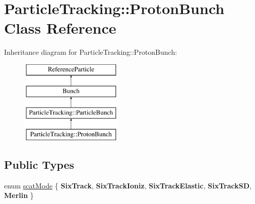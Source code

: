 \hypertarget{classParticleTracking_1_1ProtonBunch}{}\section{Particle\+Tracking\+:\+:Proton\+Bunch Class Reference}
\label{classParticleTracking_1_1ProtonBunch}
Inheritance diagram for Particle\+Tracking\+:\+:Proton\+Bunch\+:\begin{figure}[H]
\begin{center}
\leavevmode
\includegraphics[height=4.000000cm]{classParticleTracking_1_1ProtonBunch}
\end{center}
\end{figure}
\subsection*{Public Types}
\begin{DoxyCompactItemize}
\item 
enum \hyperlink{classParticleTracking_1_1ProtonBunch_acf0cdd892624c9fd814e6510e2aecf33}{scat\+Mode} \{ \newline
{\bfseries Six\+Track}, 
{\bfseries Six\+Track\+Ioniz}, 
{\bfseries Six\+Track\+Elastic}, 
{\bfseries Six\+Track\+SD}, 
\newline
{\bfseries Merlin}
 \}
\end{DoxyCompactItemize}
